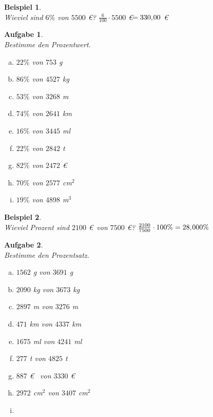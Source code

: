 \documentclass[12pt,fleqn]{article}
\theoremstyle{aufg}
\newtheorem{aufgabe}{Aufgabe}
\theoremstyle{bsp}
\newtheorem{beispiel}{Beispiel}
\begin{document}
 
    \begin{flushleft}
\begin{beispiel} ~ \\ 
Wieviel sind $6\%$ von $5500$ \euro? $\frac{6}{100}\cdot 5500$ \euro $ = 330,\hspace{-1pt}00$ \euro\end{beispiel} 
\begin{aufgabe} ~ \\ 
Bestimme den Prozentwert.\begin{multicols}{3} 
\begin{enumerate}[a)] 
\item 
$22\%$ von $753$ g
\item 
$86\%$ von $4527$ kg
\item 
$53\%$ von $3268$ m
\item 
$74\%$ von $2641$ km
\item 
$16\%$ von $3445$ ml
\item 
$22\%$ von $2842$ t
\item 
$82\%$ von $2472$ \euro~
\item 
$70\%$ von $2577$ cm$^2$
\item 
$19\%$ von $4898$ m$^3$
\end{enumerate} 
\end{multicols} 
\end{aufgabe} 
\begin{beispiel} ~ \\ 
Wieviel Prozent sind $2100$ \euro~von $7500$ \euro? $\frac{2100}{7500}\cdot 100\%  = 28,\hspace{-1pt}000\%$ \end{beispiel} 
\begin{aufgabe} ~ \\ 
Bestimme den Prozentsatz.\begin{multicols}{3} 
\begin{enumerate}[a)] 
\item 
$1562$ g von $3691$ g
\item 
$2090$ kg von $3673$ kg
\item 
$2897$ m von $3276$ m
\item 
$471$ km von $4337$ km
\item 
$1675$ ml von $4241$ ml
\item 
$277$ t von $4825$ t
\item 
$887$ \euro~ von $3330$ \euro~
\item 
$2972$ cm$^2$ von $3407$ cm$^2$
\item 

\end{enumerate}
\end{multicols}
\end{aufgabe}
\end{flushleft}
\end{document}
